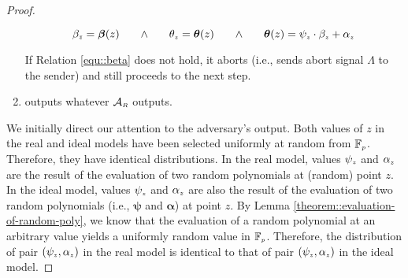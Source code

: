 \begin{proof}
\begin{enumerate}
\vspace{-1mm}
\begin{equation}\label{equ::beta}
 \beta_{\scriptscriptstyle \bar z}={\bm\beta}( z) \hspace{6mm} \wedge \hspace{6mm} \theta_{\scriptscriptstyle  z}={\bm\theta}( z) \hspace{6mm}\wedge\hspace{6mm} {\bm\theta}( z)=  \psi_{\scriptscriptstyle  z}\cdot \beta_{\scriptscriptstyle  z}+\alpha_{\scriptscriptstyle  z}
 \end{equation}
%







%
 If Relation \ref{equ::beta} does not hold, it aborts (i.e., sends abort signal $\Lambda$ to the sender) and still proceeds to the next step. 
 
 \item outputs whatever $\mathcal{A}_{\scriptscriptstyle R}$ outputs. 
%
\end{enumerate}

We initially direct our attention to the adversary's output. Both values of $z$ in the real and ideal models have been selected uniformly at random from $\mathbb{F}_{\scriptscriptstyle p}$. Therefore, they have identical distributions. In the real model, values  $\psi_{\scriptscriptstyle z}$ and $\alpha_{\scriptscriptstyle z}$ are the result of the evaluation of two random polynomials at (random) point $z$. In the ideal model, values $\psi_{\scriptscriptstyle  z}$ and $\alpha_{\scriptscriptstyle z}$ are also the result of the evaluation of two random polynomials (i.e., ${\bm\psi}$ and ${\bm\alpha}$) at point $ z$.  By Lemma \ref{theorem::evaluation-of-random-poly}, we know that the evaluation of a random polynomial at an arbitrary value  
 yields a uniformly random value in $\mathbb{F}_{\scriptscriptstyle p}$. Therefore, the distribution of pair $(\psi_{\scriptscriptstyle z}, \alpha_{\scriptscriptstyle z})$ in the real model is identical to that of pair $( \psi_{\scriptscriptstyle  z}, \alpha_{\scriptscriptstyle  z})$ in the ideal model. 
 

\end{proof}
